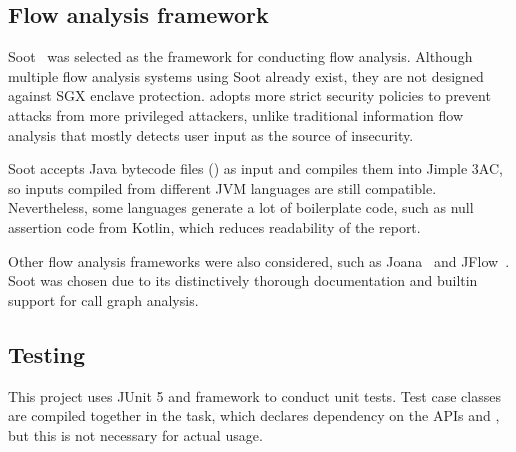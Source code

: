 \subsection{Flow analysis framework}\label{subsec:flow-analysis-framework}
Soot~\cite{sootsurvivor} was selected as the framework for conducting flow analysis.
Although multiple flow analysis systems using Soot already exist,
they are not designed against \ac{SGX} enclave protection.
\pname{} adopts more strict security policies
to prevent attacks from more privileged attackers,
unlike traditional information flow analysis
that mostly detects user input as the source of insecurity.

Soot accepts Java bytecode files () as input
and compiles them into Jimple \ac{3AC},
so inputs compiled from different \ac{JVM} languages are still compatible.
Nevertheless, some languages generate a lot of boilerplate code,
such as null assertion code from Kotlin,
which reduces readability of the report.

Other flow analysis frameworks were also considered,
such as Joana~\cite{joana} and JFlow~\cite{jflow}.
Soot was chosen due to its distinctively thorough documentation
and builtin support for call graph analysis.

\subsection{Testing}\label{subsec:testing}
This project uses JUnit 5 and  framework
to conduct unit tests.
Test case classes are compiled together in the  task,
which declares dependency on the APIs  and ,
but this is not necessary for actual usage.
